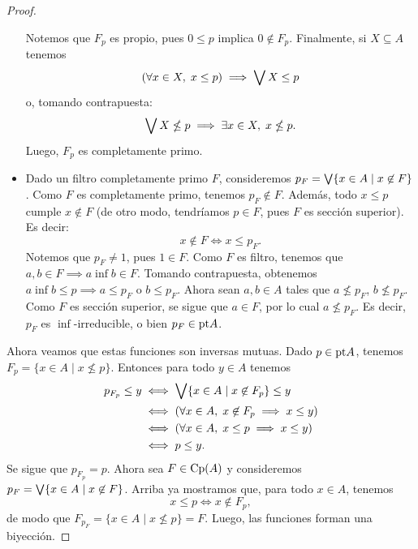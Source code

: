 \begin{proof}
\begin{itemize}
        Notemos que $F_p$ es propio, pues $0\leq p$
        implica $0\nin F_p$.
        Finalmente, si $X\subseteq A$ tenemos
        \[
            (\forall x\in X,\; x\leq p)\implies\bigvee X\leq p
        \]
        o, tomando contrapuesta:
        \[
            \bigvee X\nleq p \implies \exists x\in X,\; x\nleq p
        .\]
        Luego, $F_p$ es completamente primo.
        \item
        Dado un filtro completamente primo $F$,
        consideremos $p_F=\bigvee\{x\in A\mid x\not\in F\}$.
        Como $F$ es completamente primo, tenemos $p_F\nin F$.
        Además, todo $x\leq p$ cumple $x\nin F$
        (de otro modo, tendríamos $p\in F$,
        pues $F$ es sección superior).
        Es decir:
        \[
            x\nin F\iff x\leq p_F
        .\]
        Notemos que $p_F\neq 1$, pues $1\in F$.
        Como $F$ es filtro, tenemos que
        $a,b\in F\implies a\inf b\in F$.
        Tomando contrapuesta, obtenemos
        $a\inf b\leq p\implies a\leq p_F$ o $b\leq p_F$.
        Ahora sean $a,b\in A$ tales que $a\nleq p_F$, $b\nleq p_F$.
        Como $F$ es sección superior, se sigue que $a\in F$,
        por lo cual $a\nleq p_F$.
        Es decir, $p_F$ es $\inf$-irreducible,
        o bien $p_F\in\mathrm{pt} A$.
    \end{itemize}
    Ahora veamos que estas funciones son inversas mutuas.
    Dado $p\in\mathrm{pt} A$, tenemos $F_p=\{x\in A\mid x\nleq p\}$.
    Entonces para todo $y\in A$ tenemos
    \begin{align*}
        p_{F_p} \leq y
        &\iff \bigvee\{x\in A\mid x\not\in F_p\}\leq y \\
        &\iff (\forall x\in A,\; x\not\in F_p\implies x\leq y) \\
        &\iff (\forall x\in A,\; x\leq p\implies x\leq y) \\
        &\iff p\leq y.
    \end{align*}
    Se sigue que $p_{F_p}=p$.
    Ahora sea $F\in\mathrm{Cp}(A)$ y consideremos
    $p_F=\bigvee\{x\in A\mid x\not\in F\}$.
    Arriba ya mostramos que, para todo $x\in A$, tenemos
    \[
        x\leq p \iff x\nin F_p
    ,\]
    de modo que $F_{p_F}=\{x\in A\mid x\nleq p\}=F$.
    Luego, las funciones forman una biyección.
    

\end{proof}

